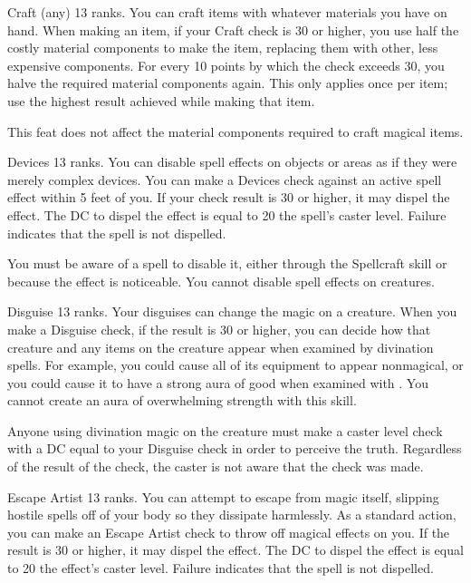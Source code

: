 \featpre Craft (any) 13 ranks.
\featben You can craft items with whatever materials you have on hand. When making an item, if your Craft check is 30 or higher, you use half the costly material components to make the item, replacing them with other, less expensive components. For every 10 points by which the check exceeds 30, you halve the required material components again. This only applies once per item; use the highest result achieved while making that item.

This feat does not affect the material components required to craft magical items.

\featpre Devices 13 ranks.
\featben You can disable spell effects on objects or areas as if they were merely complex devices. You can make a Devices check against an active spell effect within 5 feet of you. If your check result is 30 or higher, it may dispel the effect. The DC to dispel the effect is equal to 20 \add the spell's caster level. Failure indicates that the spell is not dispelled. 

You must be aware of a spell to disable it, either through the Spellcraft skill or because the effect is noticeable. You cannot disable spell effects on creatures.

\featpre Disguise 13 ranks.
\featben Your disguises can change the magic on a creature. When you make a Disguise check, if the result is 30 or higher, you can decide how that creature and any items on the creature appear when examined by divination spells. For example, you could cause all of its equipment to appear nonmagical, or you could cause it to have a strong aura of good when examined with . You cannot create an aura of overwhelming strength with this skill.

Anyone using divination magic on the creature must make a caster level check with a DC equal to your Disguise check in order to perceive the truth. Regardless of the result of the check, the caster is not aware that the check was made.

\featpre Escape Artist 13 ranks.
\featben You can attempt to escape from magic itself, slipping hostile spells off of your body so they dissipate harmlessly. As a standard action, you can make an Escape Artist check to throw off magical effects on you. If the result is 30 or higher, it may dispel the effect. The DC to dispel the effect is equal to 20 \add the effect's caster level. Failure indicates that the spell is not dispelled.

